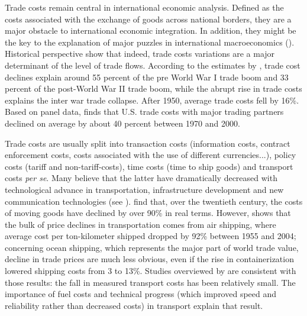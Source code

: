 \documentclass[a4paper,11pt]{article}
\begin{document}
\noindent Trade costs remain central in international economic analysis. Defined as the costs associated with the exchange of goods across national borders, they are a major obstacle to international economic integration. In addition, they might be the key to the explanation of major puzzles in international macroeconomics (\citealp{rogoff}). Historical perspective show that indeed, trade costs variations are a major determinant of the level of trade flows. According to the estimates by \citet{Jacks08}, trade cost declines explain around 55 percent of the pre World War I trade boom and 33 percent of the post-World War II trade boom, while the abrupt rise in trade costs explains the inter war trade collapse. After 1950, average trade costs fell by 16\%. Based on panel data, \citet{novy13} finds  that U.S. trade costs with major trading partners declined on average by about 40 percent between 1970 and 2000.

Trade costs are usually split into transaction costs (information costs, contract enforcement costs, costs associated with the use of different currencies...), policy costs (tariff  and non-tariff-costs), time costs (time to ship goods) and transport costs \emph{per se}. Many believe that the latter have dramatically decreased with technological advance in transportation, infrastructure development and new communication technologies (see \citealp{Lafourcade_Thisse}). \citet{Glaeser04} find that, over the twentieth century, the costs of moving goods have declined by over 90\% in real terms. However, \citet{hummels2007} shows that the bulk of price declines in transportation comes from air shipping, where average cost per ton-kilometer shipped dropped by 92\% between 1955 and 2004; concerning ocean shipping, which represents the major part of world trade value, decline in trade prices are much less obvious, even if the rise in containerization lowered shipping costs from 3 to 13\%. Studies overviewed by \citet{Behar_Venables} are consistent with those results: the fall in measured transport costs has been relatively small. The importance of fuel costs and technical progress (which improved speed and reliability rather than decreased costs) in transport explain that result.
\end{document}

